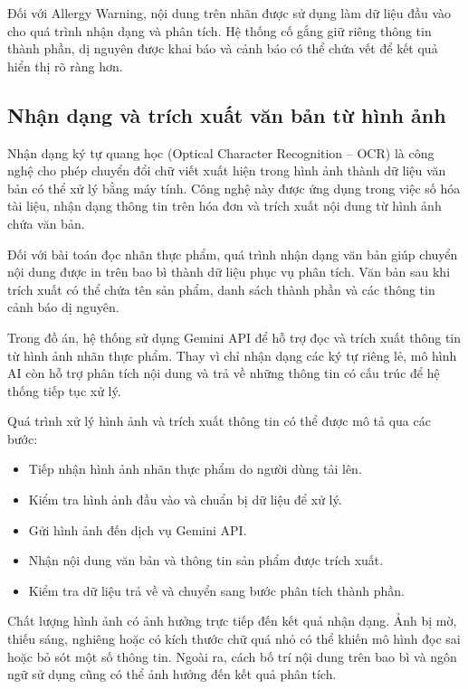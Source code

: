 	Đối với Allergy Warning, nội dung trên nhãn được sử dụng làm dữ liệu
	đầu vào cho quá trình nhận dạng và phân tích. Hệ thống cố gắng giữ
	riêng thông tin thành phần, dị nguyên được khai báo và cảnh báo có
	thể chứa vết để kết quả hiển thị rõ ràng hơn.
	
	\subsection{Nhận dạng và trích xuất văn bản từ hình ảnh}
	
	Nhận dạng ký tự quang học (Optical Character Recognition -- OCR)
	là công nghệ cho phép chuyển đổi chữ viết xuất hiện trong hình ảnh
	thành dữ liệu văn bản có thể xử lý bằng máy tính. Công nghệ này
	được ứng dụng trong việc số hóa tài liệu, nhận dạng thông tin trên
	hóa đơn và trích xuất nội dung từ hình ảnh chứa văn bản.
	
	Đối với bài toán đọc nhãn thực phẩm, quá trình nhận dạng văn bản
	giúp chuyển nội dung được in trên bao bì thành dữ liệu phục vụ
	phân tích. Văn bản sau khi trích xuất có thể chứa tên sản phẩm,
	danh sách thành phần và các thông tin cảnh báo dị nguyên.
	
	Trong đồ án, hệ thống sử dụng Gemini API để hỗ trợ đọc và trích
	xuất thông tin từ hình ảnh nhãn thực phẩm. Thay vì chỉ nhận dạng
	các ký tự riêng lẻ, mô hình AI còn hỗ trợ phân tích nội dung và
	trả về những thông tin có cấu trúc để hệ thống tiếp tục xử lý.
	
	Quá trình xử lý hình ảnh và trích xuất thông tin có thể được mô tả
	qua các bước:
	
	\begin{itemize}
		\item Tiếp nhận hình ảnh nhãn thực phẩm do người dùng tải lên.
		\item Kiểm tra hình ảnh đầu vào và chuẩn bị dữ liệu để xử lý.
		\item Gửi hình ảnh đến dịch vụ Gemini API.
		\item Nhận nội dung văn bản và thông tin sản phẩm được trích xuất.
		\item Kiểm tra dữ liệu trả về và chuyển sang bước phân tích thành phần.
	\end{itemize}
	
	Chất lượng hình ảnh có ảnh hưởng trực tiếp đến kết quả nhận dạng.
	Ảnh bị mờ, thiếu sáng, nghiêng hoặc có kích thước chữ quá nhỏ có
	thể khiến mô hình đọc sai hoặc bỏ sót một số thông tin. Ngoài ra,
	cách bố trí nội dung trên bao bì và ngôn ngữ sử dụng cũng có thể
	ảnh hưởng đến kết quả phân tích.
	
